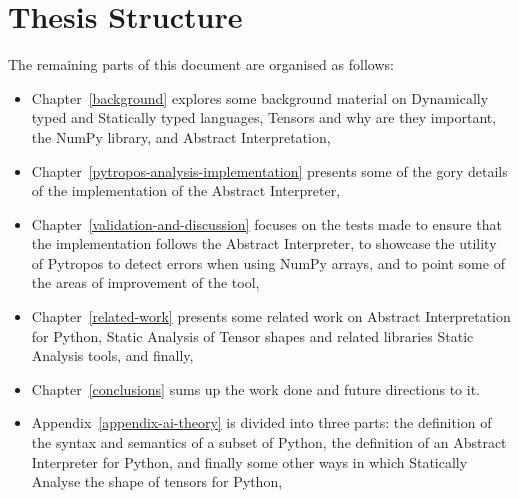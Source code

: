 
\section{Thesis Structure}\label{thesis-structure}

The remaining parts of this document are organised as follows:

\begin{itemize}
\tightlist
\item
  Chapter~\ref{background} explores some background material on
  Dynamically typed and Statically typed languages, Tensors and why are
  they important, the NumPy library, and Abstract Interpretation,
\item
  Chapter~\ref{pytropos-analysis-implementation} presents some of the
  gory details of the implementation of the Abstract Interpreter,
\item
  Chapter~\ref{validation-and-discussion} focuses on the tests made to
  ensure that the implementation follows the Abstract Interpreter, to
  showcase the utility of Pytropos to detect errors when using NumPy
  arrays, and to point some of the areas of improvement of the tool,
\item
  Chapter~\ref{related-work} presents some related work on Abstract
  Interpretation for Python, Static Analysis of Tensor shapes and
  related libraries Static Analysis tools, and finally,
\item
  Chapter~\ref{conclusions} sums up the work done and future directions
  to it.
\item
  Appendix~\ref{appendix-ai-theory}
  is divided into three parts: the definition of the syntax and
  semantics of a subset of Python, the definition of an Abstract
  Interpreter for Python, and finally some other ways in which
  Statically Analyse the shape of tensors for Python,
\end{itemize}
